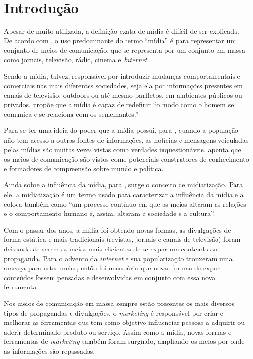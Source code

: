 \chapter[Introdução]{Introdução}
Apesar de muito utilizada, a definição exata de mídia é difícil de ser explicada. De acordo com \cite[p.49]{guazina2007}, o uso predominante do termo ``mídia'' é para representar um conjunto de meios de comunicação, que se representa por um conjunto em massa como jornais, televisão, rádio, cinema e \textit{Internet}.

Sendo a mídia, talvez, responsável por introduzir mudanças comportamentais e comerciais nas mais diferentes sociedades, seja ela por informações presentes em canais de televisão, outdoors ou até mesmo panfletos, em ambientes públicos ou privados, \cite[p.3]{escobar2007} propõe que a mídia é capaz de redefinir ``o modo como o homem se comunica e se relaciona com os semelhantes.''

Para se ter uma ideia do poder que a mídia possui, para \cite{silva2007}, quando a população não tem acesso a outras fontes de informações, as notícias e mensagens veiculadas pelas mídias são muitas vezes vistas como verdades inquestionáveis. \cite[p.53]{guazina2007} aponta que os meios de comunicação são vistos como potenciais construtores de conhecimento e formadores de compreensão sobre mundo e política.

Ainda sobre a influência da mídia, para \cite[p.54]{hjarvard2012}, surge o conceito de midiatização. Para ele, a midiatização é um termo usado para caracterizar a influência da mídia e a coloca também como ``um processo contínuo em que os meios alteram as relações e o comportamento humano e, assim, alteram a sociedade e a cultura''. 

Com o passar dos anos, a mídia foi obtendo novas formas, as divulgações de forma estática e mais tradicionais (revistas, jornais e canais de televisão) foram deixando de serem os meios mais eficientes de se expor um conteúdo ou propaganda. Para \cite{meditsch2001} o advento da \textit{internet} e sua popularização trouxeram uma ameaça para estes meios, então foi necessário que novas formas de expor conteúdos fossem pensadas e desenvolvidas em conjunto com essa nova ferramenta.

Nos meios de comunicação em massa sempre estão presentes os mais diversos tipos de propagandas e divulgações, o \textit{marketing} é responsável por criar e melhorar as ferramentas que tem como objetivo influenciar pessoas a adquirir ou aderir determinado produto ou serviço. Assim como a mídia, novas formas e ferramentas de \textit{marketing} também foram surgindo, ampliando os meios por onde as informações são repassadas. 

